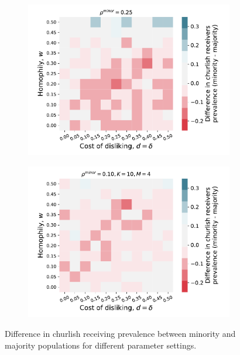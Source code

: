 \documentclass[11pt,letterpaper]{article}
\begin{document}
\begin{appendices}
\begin{figure}[H]
  \begin{subfigure}{0.48\textwidth}
    \centering
    \includegraphics[width=\textwidth]{Figures/churlish_receivers_diff_0p25.pdf}
  \end{subfigure}
  \hfill
  \begin{subfigure}{0.48\textwidth}
    \centering
    \includegraphics[width=\textwidth]{Figures/churlish_receivers_diff_0p10_K=10_M=4.pdf}
  \end{subfigure}
  \caption{Difference in churlish receiving prevalence between minority and majority
  populations for different parameter settings.}
\end{figure}


\end{appendices}
\end{document}
